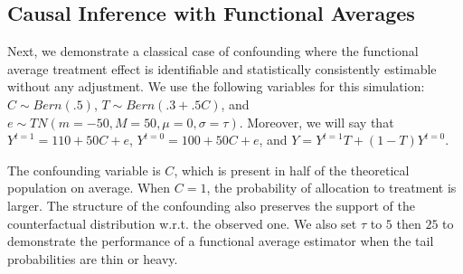 \documentclass[12pt]{amsart}
\theoremstyle{plain}%
\theoremstyle{definition}
\theoremstyle{remark}
\numberwithin{equation}{section}
\begin{document}
\subsection{Causal Inference with Functional Averages}
Next, we demonstrate a classical case of confounding where the functional average treatment effect is identifiable and statistically consistently estimable without any adjustment. We use the following variables for this simulation: $C \sim Bern(.5)$, $T \sim Bern(.3 + .5C)$, and $e \sim TN(m=-50, M=50, \mu = 0, \sigma = \tau)$. Moreover, we will say that $Y^{t=1} = 110 + 50C + e$, $ Y^{t=0} = 100 + 50C + e$, and $Y = Y^{t=1}T + (1-T)Y^{t=0}$.

The confounding variable is $C$, which is present in half of the theoretical population on average. When $C=1$, the probability of allocation to treatment is larger. The structure of the confounding also preserves the support of the counterfactual distribution w.r.t. the observed one. We also set $\tau$ to $5$ then $25$ to demonstrate the performance of a functional average estimator when the tail probabilities are thin or heavy.
\end{document}
